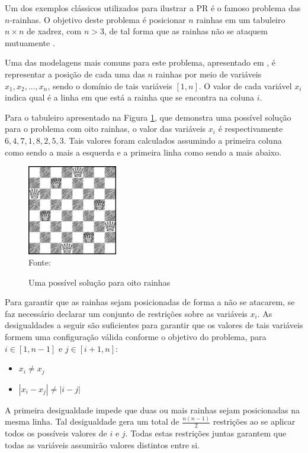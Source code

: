 Um dos exemplos clássicos utilizados para ilustrar a PR é o famoso problema das $n$-rainhas. O objetivo deste problema é posicionar $n$ rainhas em um tabuleiro $n \times n$ de xadrez, com $n > 3$, de tal forma que as rainhas não se ataquem mutuamente \cite{apt}.

Uma das modelagens mais comuns para este problema, apresentado em \cite{apt}, é representar a posição de cada uma das $n$ rainhas por meio de variáveis $x_1, x_2, ..., x_n$, sendo o domínio de tais variáveis $[1,n]$. O valor de cada variável $x_i$ indica qual é a linha em que está a rainha que se encontra na coluna $i$.

Para o tabuleiro apresentado na Figura \ref{fg:8-queens}, que demonstra uma possível solução para o problema com oito rainhas, o valor das variáveis $x_i$ é respectivamente $6, 4, 7, 1, 8, 2, 5, 3$. Tais valores foram calculados assumindo a primeira coluna como sendo a mais a esquerda e a primeira linha como sendo a mais abaixo.

\begin{figure}[!ht]
  \centering
  \caption{Uma possível solução para oito rainhas}
  \label{fg:8-queens}
  \includegraphics[width=0.35\textwidth]{figuras/8_queens.png}
  \\ Fonte: \cite{apt}
\end{figure}

Para garantir que as rainhas sejam posicionadas de forma a não se atacarem, se faz necessário declarar um conjunto de restrições sobre as variáveis $x_i$. As desigualdades a seguir são suficientes para garantir que os valores de tais variáveis formem uma configuração válida conforme o objetivo do problema, para $i \in [1,n-1]$ e $j \in [i+1,n]$:

\begin{itemize}
  \item $x_i \not= x_j$
  \item $|x_i - x_j| \not= |i - j|$
\end{itemize}

A primeira desigualdade impede que duas ou mais rainhas sejam posicionadas na mesma linha. Tal desigualdade gera um total de $\frac{n(n-1)}{2}$ restrições ao se aplicar todos os possíveis valores de $i$ e $j$. Todas estas restrições juntas garantem que todas as variáveis assumirão valores distintos entre si.

